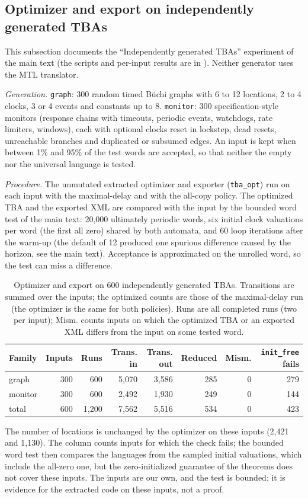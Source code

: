 \subsection{Optimizer and export on independently generated TBAs}\label{sec:independent-detail}
This subsection documents the ``Independently generated TBAs'' experiment of the main text (the scripts and per-input results are in ). Neither generator uses the MTL translator.

\emph{Generation.} \texttt{graph}: 300 random timed B\"uchi graphs with 6 to 12 locations, 2 to 4 clocks, 3 or 4 events and constants up to 8. \texttt{monitor}: 300 specification-style monitors (response chains with timeouts, periodic events, watchdogs, rate limiters, windows), each with optional clocks reset in lockstep, dead resets, unreachable branches and duplicated or subsumed edges. An input is kept when between 1\% and 95\% of the test words are accepted, so that neither the empty nor the universal language is tested.

\emph{Procedure.} The unmutated extracted optimizer and exporter (\texttt{tba\_opt}) run on each input with the maximal-delay and with the all-copy policy. The optimized TBA and the exported XML are compared with the input by the bounded word test of the main text: 20{,}000 ultimately periodic words, six initial clock valuations per word (the first all zero) shared by both automata, and 60 loop iterations after the warm-up (the default of 12 produced one spurious difference caused by the horizon, see the main text). Acceptance is approximated on the unrolled word, so the test can miss a difference.

\begin{table}[t]
\centering
\caption{Optimizer and export on 600 independently generated TBAs. Transitions are summed over the inputs; the optimized counts are those of the maximal-delay run (the optimizer is the same for both policies). Runs are all completed runs (two per input); Mism. counts inputs on which the optimized TBA or an exported XML differs from the input on some tested word.}
\label{tab:independent}
\footnotesize\setlength{\tabcolsep}{3pt}\begin{tabular}{lrrrrrrr}
\toprule
Family & Inputs & Runs & Trans. in & Trans. out & Reduced & Mism. & \texttt{init\_free} fails \\
\midrule
graph & 300 & 600 & 5{,}070 & 3{,}586 & 285 & 0 & 279 \\
monitor & 300 & 600 & 2{,}492 & 1{,}930 & 249 & 0 & 144 \\
total & 600 & 1{,}200 & 7{,}562 & 5{,}516 & 534 & 0 & 423 \\
\bottomrule
\end{tabular}
\end{table}

The number of locations is unchanged by the optimizer on these inputs (2{,}421 and 1{,}130). The  column counts inputs for which the check fails; the bounded word test then compares the languages from the sampled initial valuations, which include the all-zero one, but the zero-initialized guarantee of the theorems does not cover these inputs. The inputs are our own, and the test is bounded; it is evidence for the extracted code on these inputs, not a proof.

